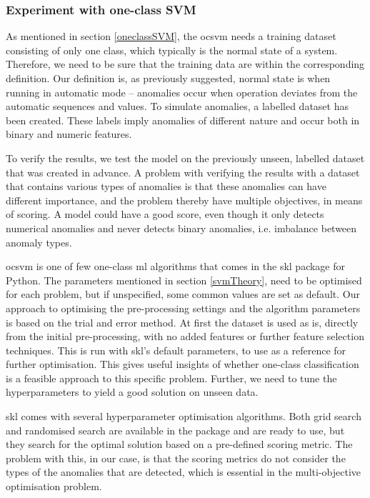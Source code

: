 \documentclass[english, a4paper]{report}
\begin{document}
{{{            \subsubsection{Experiment with one-class SVM}
            {   
                As mentioned in section \hyperref[oneclassSVM]{\ref*{oneclassSVM}}, the \gls{ocsvm} needs a training dataset consisting of only one class, which typically is the normal state of a system. Therefore, we need to be sure that the training data are within the corresponding definition. Our definition is, as previously suggested, normal state is when running in automatic mode – anomalies occur when operation deviates from the automatic sequences and values. To simulate anomalies, a labelled dataset has been created. These labels imply anomalies of different nature and occur both in binary and numeric features. 
                \par
                To verify the results, we test the model on the previously unseen, labelled dataset that was created in advance. A problem with verifying the results with a dataset that contains various types of anomalies is that these anomalies can have different importance, and the problem thereby have multiple objectives, in means of scoring. A model could have a good score, even though it only detects numerical anomalies and never detects binary anomalies, i.e. imbalance between anomaly types.
                \par
                \Gls{ocsvm} is one of few one-class \glsdesc{ml} algorithms that comes in the \gls{skl} package for Python. The parameters mentioned in section \ref{svmTheory}, need to be optimised for each problem, but if unspecified, some common values are set as default. Our approach to optimising the pre-processing settings and the algorithm parameters is based on the trial and error method. At first the dataset is used as is, directly from the initial pre-processing, with no added features or further feature selection techniques. This is run with \gls{skl}'s default parameters, to use as a reference for further optimisation. This gives useful insights of whether one-class classification is a feasible approach to this specific problem. Further, we need to tune the hyperparameters to yield a good solution on unseen data. 
                \par
                \Gls{skl} comes with several hyperparameter optimisation algorithms. Both grid search and randomised search are available in the package and are ready to use, but they search for the optimal solution based on a pre-defined scoring metric. The problem with this, in our case, is that the scoring metrics do not consider the types of the anomalies that are detected, which is essential in the multi-objective optimisation problem. 
}}}}
\end{document}
